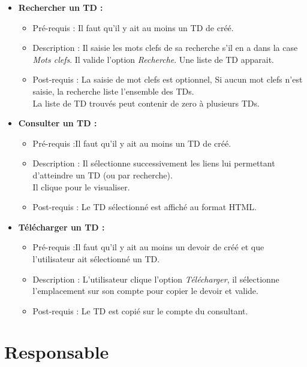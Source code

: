 \begin{itemize}
\item {\bf Rechercher un TD :}
	\begin{itemize}
	\item Pr{\'e}-requis : Il faut qu'il y ait au moins un TD de cr{\'e}{\'e}.
	\item Description : Il saisie les mots clefs de sa recherche s'il en a dans la case {\it Mots clefs}.
	Il valide l'option {\it Recherche}.
	Une liste de TD apparait.
	\item Post-requis : La saisie de mot clefs est optionnel, Si aucun mot clefs n'est saisie, la recherche liste l'ensemble des TDs.\\
	La liste de TD trouv{\'e}s peut contenir de zero {\`a} plusieurs TDs.\\
	\end{itemize}
\item {\bf Consulter un TD :}
	\begin{itemize}
	\item Pr{\'e}-requis :Il faut qu'il y ait au moins un TD de cr{\'e}{\'e}.
	\item Description : Il s{\'e}lectionne successivement les liens lui permettant d'atteindre un TD (ou par recherche).\\
	Il clique pour le visualiser.
	\item Post-requis : Le TD s{\'e}lectionn{\'e} est affich{\'e} au format HTML.\\
	\end{itemize}
	
\item {\bf T{\'e}l{\'e}charger un TD :}
	\begin{itemize}
	\item Pr{\'e}-requis :Il faut qu'il y ait au moins un devoir de cr{\'e}{\'e} et que l'utilisateur ait s{\'e}lectionn{\'e} un TD.
	\item Description : L'utilisateur clique l'option {\it T{\'e}l{\'e}charger}, il s{\'e}lectionne l'emplacement sur son compte pour copier le devoir et valide.
	\item Post-requis : Le TD est copi{\'e} sur le compte du consultant.\\
	\end{itemize}
\end{itemize}

\section*{Responsable}

